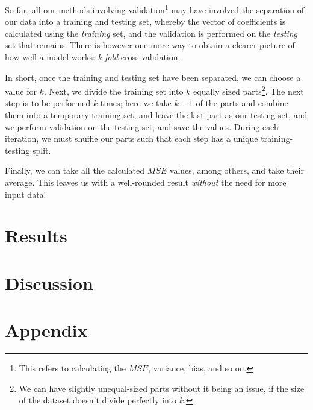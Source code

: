 \documentclass[a4paper,10pt,english]{article}
\begin{document}
	So far, all our methods involving validation\footnote{This refers to calculating the $MSE$, variance, bias, and so on.} may have involved the separation of our data into a training and testing set, whereby the vector of coefficients is calculated using the \textit{training} set, and the validation is performed on the \textit{testing} set that remains.	There is however one more way to obtain a clearer picture of how well a model works: \textit{k-fold} cross validation.	
	
	In short, once the training and testing set have been separated, we can choose a value for $k$.  Next, we divide the training set into $k$ equally sized parts\footnote{We can have slightly unequal-sized parts without it being an issue, if the size of the dataset doesn't divide perfectly into $k$.}.  The next step is to be performed $k$ times; here we take $k-1$ of the parts and combine them into a temporary training set, and leave the last part as our testing set, and we perform validation on the testing set, and save the values.  During each iteration, we must shuffle our parts such that each step has a unique training-testing split.
	
	Finally, we can take all the calculated $MSE$ values, among others, and take their average.  This leaves us with a well-rounded result \textit{without} the need for more input data!
	
\section*{Results}
\label{sec:results}

\section*{Discussion}
\label{sec:discussion}

\newpage

\section*{Appendix}
\label{sec:appendix}

{}

	
\end{document}
